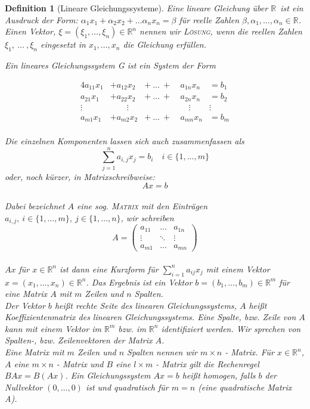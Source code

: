 \documentclass{report}
\newcommand{\IN}[1]{\index{#1|BH}}
\newcommand{\R}{\mathbb{R}}
\newcommand{\mR}{\(\mathbb{R}\)}
\newcommand{\Rn}{\mathbb{R}^n}
\theoremstyle{customrem}
\theoremstyle{customdef}
\newtheorem*{definitionn}{Definition} %
\theoremstyle{customenv}
\newcommand{\defemph}[1]{\textsc{#1}}
\begin{document}
	\begin{definitionn}[Lineare Gleichungssysteme]
		\IN{Lineare Gleichungssysteme}
		\label{deflingl}
		Eine lineare Gleichung über \mR\ ist ein Ausdruck der Form: \(\alpha_1x_1 + \alpha_2 x_2 + \dots \alpha_n x_n = \beta\) für reelle Zahlen \(\beta, \alpha_1, \dots, \alpha_n \in \R\). Einen Vektor, \(\xi = \left(\xi_1, \dots, \xi_n\right) \in \Rn\) nennen wir \defemph{Lösung}, wenn die reellen Zahlen  \(\xi_1, \ \dots\ , \xi_n\) eingesetzt in \(x_1, \dots, x_n\) die Gleichung erfüllen. \pagebreak[3]
		
		Ein lineares Gleichungssystem G ist ein System der Form
		
		\begin{alignat*}{4}
			a_{11} x_1	&+ a_{12}x_2	&+\ \dots\ +\	& a_{1n} x_n	&= b_1\\
			a_{21} x_1 	&+ a_{22}x_2 	&+\ \dots\ +\	& a_{2n} x_n	&= b_2\\
			\vdots\quad & \qquad\vdots	& &\quad\vdots	& \vdots\ \\
			a_{m1} x_1 	&+ a_{m2} x_2  	&+\ \dots\ +\	& a_{mn} x_n	&= b_m\\
		\end{alignat*}
		
		 Die einzelnen Komponenten lassen sich auch zusammenfassen als \[\sum_{j=1}^n a_{i,j} x_j = b_i \quad i\in\{1,\dots,m\}\]
		oder, noch kürzer, in Matrixschreibweise:
		\[Ax=b\]\\
		Dabei bezeichnet \(A\) eine sog. \defemph{Matrix} mit den Einträgen \(a_{i,j},\ i\in\{1, \dots , m\},\ j\in\{1, \dots, n\}\), wir schreiben\\
		\[A =
		\begin{pmatrix}
		a_{11} & \dots  & a_{1n}\\
		\vdots & \ddots & \vdots\\
		a_{m1} & \dots  & a_{mn}
		\end{pmatrix}
		\]\\
		\(Ax\) für \(x \in \Rn\) ist dann eine Kurzform für \(\sum_{i=1}^na_{ij}x_j\) mit einem Vektor \(x = (x_1, \dots, x_n) \in \Rn\). Das Ergebnis ist ein Vektor \(b = (b_1, \dots, b_m) \in \R^m\) für eine Matrix \(A\) mit \(m\) Zeilen und \(n\) Spalten.\\
		Der Vektor \(b\) heißt rechte Seite des linearen Gleichungssystems, \(A\) heißt Koeffizientenmatrix des linearen Gleichungssystems. Eine Spalte, bzw. Zeile von \(A\) kann mit einem Vektor im \(\R^m\) bzw. im \(\R^n\) identifiziert werden. Wir sprechen von Spalten-, bzw. Zeilenvektoren der Matrix \(A\).\\
		
		Eine Matrix mit \(m\) Zeilen und \(n\) Spalten nennen wir \(m\times n\) - Matrix. Für \(x  \in \Rn \), \(A\) eine \(m\times n\) - Matrix und \(B\) eine \(l\times m\) - Matrix gilt die Rechenregel \(BAx = B(Ax)\). Ein Gleichungssystem \(Ax=b\) heißt homogen, falls \(b\) der Nullvektor \((0, \dots, 0)\) ist und quadratisch für  \(m = n\) (eine quadratische Matrix A).\\
	\end{definitionn}
	
\end{document}
